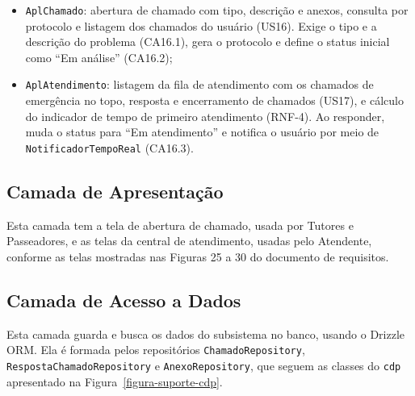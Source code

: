 \begin{itemize}
	\item \texttt{AplChamado}: abertura de chamado com tipo, descrição e anexos, consulta por protocolo e listagem dos chamados do usuário (US16). Exige o tipo e a descrição do problema (CA16.1), gera o protocolo e define o status inicial como ``Em análise'' (CA16.2);
	\item \texttt{AplAtendimento}: listagem da fila de atendimento com os chamados de emergência no topo, resposta e encerramento de chamados (US17), e cálculo do indicador de tempo de primeiro atendimento (RNF-4). Ao responder, muda o status para ``Em atendimento'' e notifica o usuário por meio de \texttt{NotificadorTempoReal} (CA16.3).
\end{itemize}


\subsection{Camada de Apresentação}
\label{sec-componentes-suporte-apresentacao}

Esta camada tem a tela de abertura de chamado, usada por Tutores e Passeadores, e as telas da central de atendimento, usadas pelo Atendente, conforme as telas mostradas nas Figuras 25 a 30 do documento de requisitos.


\subsection{Camada de Acesso a Dados}
\label{sec-componentes-suporte-dados}

Esta camada guarda e busca os dados do subsistema no banco, usando o Drizzle ORM. Ela é formada pelos repositórios \texttt{ChamadoRepository}, \texttt{RespostaChamadoRepository} e \texttt{AnexoRepository}, que seguem as classes do \texttt{cdp} apresentado na Figura~\ref{figura-suporte-cdp}.